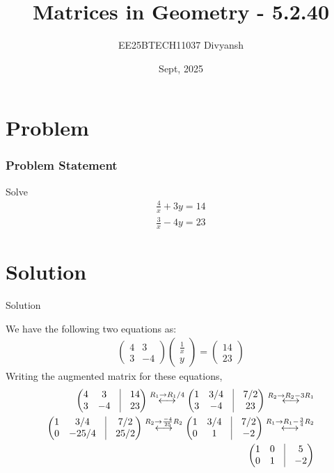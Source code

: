 \documentclass{beamer}
\title{Matrices in Geometry - 5.2.40}
\author{EE25BTECH11037  Divyansh}
\date{Sept, 2025}
\theoremstyle{remark}
\newcommand{\myvec}[1]{\ensuremath{\begin{pmatrix}#1\end{pmatrix}}}
\begin{document}
\maketitle


\section{Problem}
\begin{frame}
\frametitle{Problem Statement}
Solve
\begin{align*}
    \frac{4}{x}+3y=14 \\
    \frac{3}{x} -4y =23
\end{align*}
\end{frame}

\section{Solution}
\begin{frame}{Solution}
   
We have the following two equations as:
\begin{align}
    \myvec{4 & 3 \\ 3 & -4}\myvec{\frac{1}{x} \\ y}=\myvec{14 \\ 23}
\end{align}
Writing the augmented matrix for these equations,
\begin{align}
    \myvec{4 & 3 & \vrule & 14 \\ 3 & -4 & \vrule & 23} \overset{R_1 \rightarrow R_1 /4}{\longleftrightarrow} \myvec{1 & 3/4 & \vrule & 7/2 \\ 3 & -4 & \vrule & 23}\overset{R_2 \rightarrow R_2-3R_1}{\longleftrightarrow} \\\myvec{1 & 3/4 & \vrule & 7/2 \\ 0 & -25/4 & \vrule & 25/2} \overset{R_2 \rightarrow \frac{-4}{25}R_2}{\longleftrightarrow} \myvec{1 & 3/4 & \vrule & 7/2 \\ 0 & 1 & \vrule & -2}\overset{R_1 \rightarrow R_1-\frac{3}{4} R_2}{\longleftrightarrow}\\ \myvec{1 & 0 & \vrule & 5 \\ 0 & 1 & \vrule & -2}
\end{align}

\end{frame}
\end{document}
